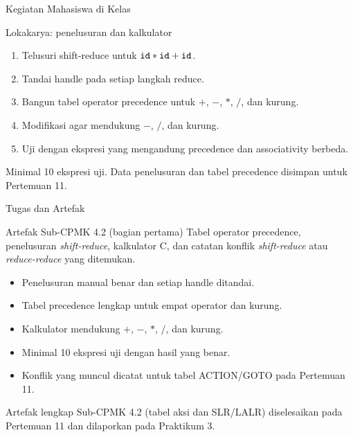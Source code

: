\documentclass[aspectratio=169,10pt,t]{beamer}
\begin{document}
\begin{frame}{Kegiatan Mahasiswa di Kelas}
  \begin{block}{Lokakarya: penelusuran dan kalkulator}
    \footnotesize
    \begin{enumerate}
      \setlength{\itemsep}{1pt}
      \item Telusuri shift-reduce untuk
            \(\texttt{id}*\texttt{id}+\texttt{id}\).
      \item Tandai handle pada setiap langkah reduce.
      \item Bangun tabel operator precedence untuk
            \(+\), \(-\), \(*\), \(/\), dan kurung.
      \item Modifikasi  agar mendukung
            \(-\), \(/\), dan kurung.
      \item Uji dengan ekspresi yang mengandung precedence dan
            associativity berbeda.
    \end{enumerate}
  \end{block}

  \vspace{4pt}
  {\footnotesize\color{ubbblue!80}Minimal 10 ekspresi uji. Data
  penelusuran dan tabel precedence disimpan untuk Pertemuan 11.}
\end{frame}

\begin{frame}{Tugas dan Artefak}
  \begin{block}{Artefak Sub-CPMK 4.2 (bagian pertama)}
    Tabel operator precedence, penelusuran \textit{shift-reduce},
    kalkulator C, dan catatan konflik \textit{shift-reduce} atau
    \textit{reduce-reduce} yang ditemukan.
  \end{block}

  \small
  \begin{itemize}
    \item Penelusuran manual benar dan setiap handle ditandai.
    \item Tabel precedence lengkap untuk empat operator dan kurung.
    \item Kalkulator mendukung \(+\), \(-\), \(*\), \(/\), dan kurung.
    \item Minimal 10 ekspresi uji dengan hasil yang benar.
    \item Konflik yang muncul dicatat untuk  tabel
          ACTION/GOTO pada Pertemuan 11.
  \end{itemize}

  \vspace{3pt}
  {\footnotesize\color{ubbblue!75}Artefak lengkap Sub-CPMK 4.2
  (tabel aksi dan  SLR/LALR) diselesaikan pada Pertemuan 11
  dan dilaporkan pada Praktikum 3.}
\end{frame}
\end{document}
